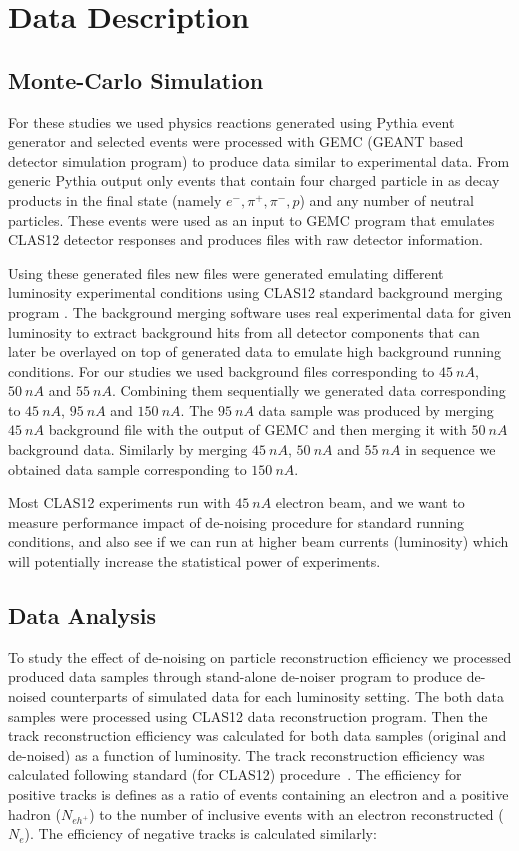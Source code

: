\section{Data Description}

\subsection{Monte-Carlo Simulation}

For these studies we used physics reactions generated using Pythia event generator and selected events were processed with GEMC (GEANT based detector simulation program) to produce data similar to experimental data. From generic Pythia output only events that contain four charged particle in as decay products in the final state (namely $e^-,\pi^+,\pi^-,p$) and any number of neutral particles. These events were used as an input to GEMC program that emulates CLAS12 detector responses and produces files with raw detector information.

Using these generated files new files were generated emulating different luminosity experimental conditions using CLAS12 standard background merging program \cite{Stepanyan:2020bg}. The background merging software uses real experimental data for given luminosity to extract background hits from all detector components that can later be overlayed on top of generated data to emulate high background running conditions. For our studies we used background files corresponding to $45~nA$, $50~nA$ and $55~nA$. Combining them sequentially we generated data corresponding to $45~nA$, $95~nA$ and $150~nA$. The $95~nA$ data sample was produced by merging $45~nA$ background file with the output of GEMC and then merging it with $50~nA$ background data. Similarly by merging $45~nA$, $50~nA$ and $55~nA$ in sequence we obtained data sample corresponding to $150~nA$. 

Most CLAS12 experiments run with $45~nA$ electron beam, and we want to measure performance impact of de-noising procedure for standard running conditions, and also see if we can run at higher beam currents (luminosity) which will potentially increase the statistical power of experiments.

\subsection{Data Analysis}

To study the effect of de-noising on particle reconstruction efficiency we processed produced data samples through stand-alone de-noiser program to produce de-noised counterparts of simulated data for each luminosity setting. The both data samples were processed using CLAS12 data reconstruction program. Then the track reconstruction efficiency was calculated for both data samples (original and de-noised) as a function of luminosity. The track reconstruction efficiency was calculated following standard (for CLAS12) procedure~\cite{Stepanyan:2020bg}. The efficiency for positive  tracks is defines as a ratio of 
events containing an electron and a positive  hadron ($N_{eh^+}$) to the number of inclusive events with an electron reconstructed ($N_{e}$). The efficiency of negative tracks is calculated similarly:

